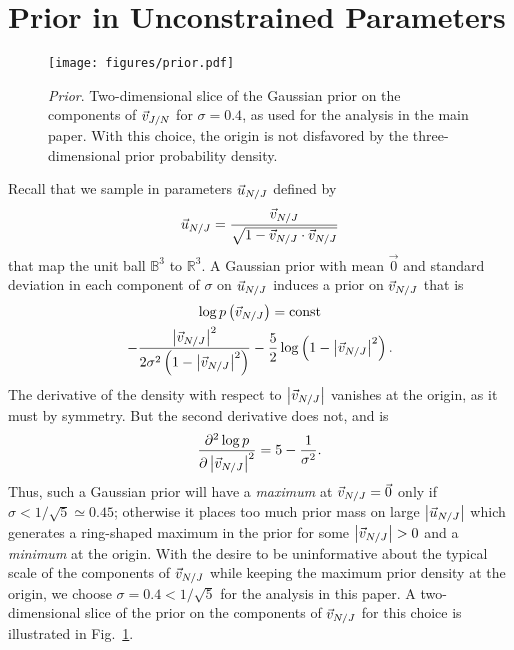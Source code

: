 \documentclass[aps,prd,twocolumn,superscriptaddress,preprintnumbers,floatfix,nofootinbib]{revtex4-2}
\begin{document}
\section{Prior in Unconstrained Parameters}
\label{app:prior}

\begin{figure}
\texttt{[image: figures/prior.pdf]}
\caption{\emph{Prior}. Two-dimensional slice of the Gaussian prior on the components of $\vec{v}_{J/N}$ for $\sigma = 0.4$, as used for the analysis in the main paper.
With this choice, the origin is not disfavored by the three-dimensional prior probability density.
}
\label{fig:prior}
\end{figure}

Recall that we sample in parameters $\vec{u}_{N/J}$ defined by 
\begin{equation}
  \vec{u}_{N/J} = \frac{\vec{v}_{N/J}}{\sqrt{1 - \vec{v}_{N/J} \cdot \vec{v}_{N/J}}}
\end{equation}
that map the unit ball $\mathbb{B}^3$ to $\mathbb{R}^3$.  A Gaussian prior with
mean $\vec{0}$ and standard deviation in each component of $\sigma$ on
$\vec{u}_{N/J}$ induces a prior on $\vec{v}_{N/J}$ that is 
\begin{multline}
  \log p\left( \vec{v}_{N/J} \right) = \mathrm{const} \\ -\frac{\left| \vec{v}_{N/J} \right|^2}{2 \sigma^2 \left(1 - \left| \vec{v}_{N/J} \right|^2 \right)} - \frac{5}{2} \log \left( 1 - \left| \vec{v}_{N/J} \right|^2 \right).
\end{multline}
The derivative of the density with respect to $\left| \vec{v}_{N/J} \right|$
vanishes at the origin, as it must by symmetry.  But the second derivative does
not, and is 
\begin{equation}
  \frac{\partial^2 \log p}{\partial \left| \vec{v}_{N/J} \right|^2} = 5 - \frac{1}{\sigma^2}.
\end{equation}
Thus, such a Gaussian prior will have a \emph{maximum} at $\vec{v}_{N/J} = \vec{0}$
only if $\sigma < 1/\sqrt{5} \simeq 0.45$; otherwise it places too much prior
mass on large $\left|\vec{u}_{N/J}\right|$ which generates a ring-shaped maximum
in the prior for some $\left| \vec{v}_{N/J} \right| > 0$ and a \emph{minimum} at the
origin.  With the desire to be uninformative about the typical scale of the components of $\vec{v}_{N/J}$
while keeping the maximum prior density at the origin, we choose $\sigma = 0.4 <
1/\sqrt{5}$ for the analysis in this paper.
A two-dimensional slice of the prior on the components of $\vec{v}_{N/J}$ for this choice is illustrated in Fig.~\ref{fig:prior}.
\end{document}
